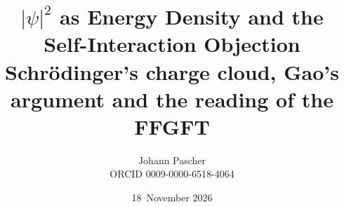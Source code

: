 \documentclass[11pt,a4paper]{report}
\title{$|\psi|^2$ as Energy Density and the Self-Interaction Objection\\[0.5em]
  \large Schrödinger's charge cloud, Gao's argument and the reading of the FFGFT}
\date{18~November 2026}
\author{Johann Pascher\\\small ORCID 0009-0000-6518-4064}
\begin{document}
\renewcommand{\thechapter}{}
\renewcommand{\thesection}{\arabic{section}}
\maketitle
\tableofcontents

\end{document}
